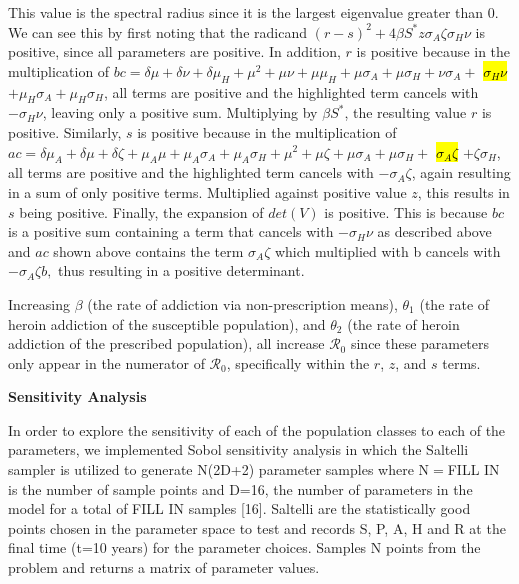 \documentclass[12pt]{article}
\begin{document}
This value is the spectral radius since it is the largest eigenvalue greater than 0. We can see this by first noting that the radicand $(r-s)^2+4\beta S^* z  \sigma_{A} \zeta \sigma_{H} \nu$ is positive, since all parameters are positive. In addition, $r$ is positive because in the multiplication of $bc=\delta \mu + \delta \nu+ \delta \mu_{H}+ \mu^{2} + \mu \nu+ \mu \mu_{H} + \mu \sigma_{A} + \mu \sigma_{H}+ \nu \sigma_{A}+$ \hl{$ \sigma_{H} \nu $} $+ \mu_{H}\sigma_{A}+\mu_{H}\sigma_{H}$, all terms are positive and the highlighted term cancels with $-\sigma_{H} \nu$, leaving only a positive sum. Multiplying by $\beta S^*$, the resulting value $r$ is positive. Similarly, $s$ is positive because in the multiplication of $ac=\delta \mu_{A} + \delta \mu + \delta \zeta + \mu_{A} \mu+ \mu_{A} \sigma_{A}+\mu_{A} \sigma_{H} +\mu^{2} +\mu \zeta+ \mu \sigma_{A}+\mu \sigma_{H}+$ \hl{$\sigma_{A} \zeta$} $+ \zeta \sigma_{H}$, all terms are positive and the highlighted term cancels with $-\sigma_{A} \zeta$, again resulting in a sum of only positive terms. Multiplied against positive value $z$, this results in $s$ being positive. Finally, the expansion of $det(V)$ is positive. This is because $bc$ is a positive sum containing a term that cancels with $-\sigma_{H} \nu$ as described above and $ac$ shown above contains the term $\sigma_{A} \zeta$ which multiplied with b cancels with $-\sigma_A\zeta b,$ thus resulting in a positive determinant. 

Increasing $\beta$ (the rate of addiction via non-prescription means), $\theta_1$ (the rate of heroin addiction of the susceptible population), and $\theta_2$ (the rate of heroin addiction of the prescribed population), all increase $\mathscr{R}_0$ since these parameters only appear in the numerator of $\mathscr{R}_0$, specifically within the $r$, $z$, and $s$ terms. 

\textbf{Sensitivity Analysis} 

In order to explore the sensitivity of each of the population classes to each of the parameters, we implemented Sobol sensitivity analysis in which the Saltelli sampler is utilized to generate N(2D+2) parameter samples where N$=$FILL IN is the number of sample points and D=16, the number of parameters in the model for a total of FILL IN samples [16]. 
Saltelli are the statistically good points chosen in the parameter space to test and records S, P, A, H and R at the final time (t=10 years) for the parameter choices. Samples N points from the problem and returns a matrix of parameter values. 
\end{document}
